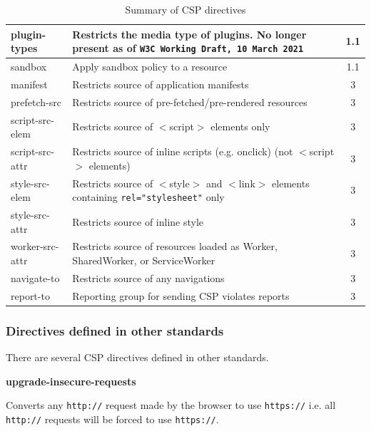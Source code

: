 \documentclass{mscreport}
\begin{document}
\begin{table}[h!]
\begin{center}
\begin{tabular}{|l|J|c|}
      \hline
      plugin-types & Restricts the media type of plugins. No longer present as of \texttt{W3C Working Draft, 10 March 2021} \cite{noauthor_undated-xf} & 1.1\\
      \hline
      sandbox & Apply sandbox policy to a resource & 1.1\\
      \hline
      manifest & Restricts source of application manifests & 3 \\
      \hline
      prefetch-src & Restricts source of pre-fetched/pre-rendered resources & 3 \\
      \hline
      script-src-elem & Restricts source of $<$script$>$ elements only & 3 \\
      \hline
      script-src-attr & Restricts source of inline scripts (e.g. onclick) (not $<$script$>$ elements) & 3 \\
      \hline
      style-src-elem & Restricts source of $<$style$>$ and $<$link$>$ elements containing \texttt{rel="stylesheet"} only & 3 \\
      \hline
      style-src-attr & Restricts source of inline style & 3 \\
      \hline
      worker-src-attr & Restricts source of resources loaded as Worker, SharedWorker, or ServiceWorker & 3 \\
      \hline
      navigate-to & Restricts source of any navigations & 3 \\
      \hline
      report-to & Reporting group for sending CSP violates reports & 3 \\
      \hline
    \end{tabular}
    \caption{Summary of CSP directives}
    \label{table:cpsdirectives1} %
  \end{center}
\end{table}

\clearpage

\subsubsection{Directives defined in other standards}

There are several CSP directives defined in other standards.

\vspace{0.7cm} \noindent
\textbf{upgrade-insecure-requests}

\vspace{0.3cm} \noindent
Converts any \texttt{http://} request made by the browser to use \texttt{https://} i.e. all \texttt{http://} requests will be forced to use \texttt{https://}.
\end{document}
